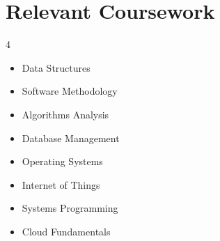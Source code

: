 \documentclass[letterpaper,11pt]{article}
\makeatletter
\newcommand{\resumeItem}[1]{
  \item\small{
    {#1 \vspace{-2pt}}
  }
}
\newcommand{\resumeSubheading}[4]{
  \vspace{-2pt}\item
    \begin{tabular*}{1.0\textwidth}[t]{l@{\extracolsep{\fill}}r}
      \textbf{#1} & \textbf{\small #2} \\
      \textit{\small#3} & \textit{\small #4} \\
    \end{tabular*}\vspace{-7pt}
}
\newcommand{\resumeSubHeadingListStart}{\begin{itemize}[leftmargin=0.0in, label={}]}
\newcommand{\resumeSubHeadingListEnd}{\end{itemize}}
\newcommand{\resumeItemListStart}{\begin{itemize}}
\newcommand{\resumeItemListEnd}{\end{itemize}\vspace{-5pt}}
\makeatother
\begin{document}
\section{Relevant Coursework}
        \begin{multicols}{4}
            \begin{itemize}[itemsep=-5pt, parsep=3pt]
                \item\small Data Structures
                \item Software Methodology 
                \item Algorithms Analysis
                \item Database Management
                \item Operating Systems
                \item Internet of Things
                \item Systems Programming
                \item Cloud Fundamentals
            \end{itemize}
        \end{multicols}
        \vspace*{2.0\multicolsep}




    
\end{document}
